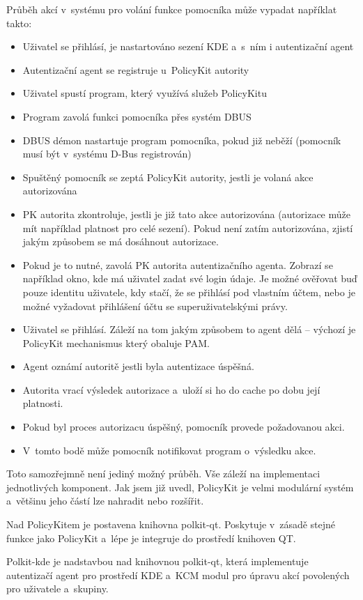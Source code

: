 {Průběh akcí v~systému pro volání funkce pomocníka může vypadat napříklat takto:
\begin{itemize}
\item Uživatel se přihlásí, je nastartováno sezení KDE a~s~ním i autentizační agent
\item Autentizační agent se registruje u~PolicyKit autority
\item Uživatel spustí program, který využívá služeb PolicyKitu
\item Program zavolá funkci pomocníka přes systém DBUS
\item DBUS démon nastartuje program pomocníka, pokud již neběží (pomocník musí být v~systému D-Bus registrován)
\item Spuštěný pomocník se zeptá PolicyKit autority, jestli je volaná akce autorizována
\item PK autorita zkontroluje, jestli je již tato akce autorizována (autorizace může mít například platnost pro celé sezení). Pokud není zatím autorizována, zjistí jakým způsobem se má dosáhnout autorizace.
\item Pokud je to nutné, zavolá PK autorita autentizačního agenta. Zobrazí se například okno, kde má uživatel zadat své login údaje. Je možné ověřovat buď pouze identitu uživatele, kdy stačí, že se přihlásí pod vlastním účtem, nebo je možné vyžadovat přihlášení účtu se superuživatelskými právy.
\item Uživatel se přihlásí. Záleží na tom jakým způsobem to agent dělá -- výchozí je PolicyKit mechanismus který obaluje PAM.
\item Agent oznámí autoritě jestli byla autentizace úspěšná.
\item Autorita vrací výsledek autorizace a~uloží si ho do cache po dobu její platnosti.
\item Pokud byl proces autorizacu úspěšný, pomocník provede požadovanou akci.
\item V~tomto bodě může pomocník notifikovat program o~výsledku akce.
\end{itemize}

Toto samozřejmně není jediný možný průběh. Vše záleží na implementaci jednotlivých komponent. Jak jsem již uvedl, PolicyKit je velmi modulární systém a~většinu jeho částí lze nahradit nebo rozšířit.

Nad PolicyKitem je postavena knihovna polkit-qt. Poskytuje v~zásadě stejné funkce jako PolicyKit a~lépe je integruje do prostředí knihoven QT. %

Polkit-kde je nadstavbou nad knihovnou polkit-qt, která implementuje autentizačí agent pro prostředí KDE a~KCM modul pro úpravu akcí povolených pro uživatele a~skupiny. %

}
